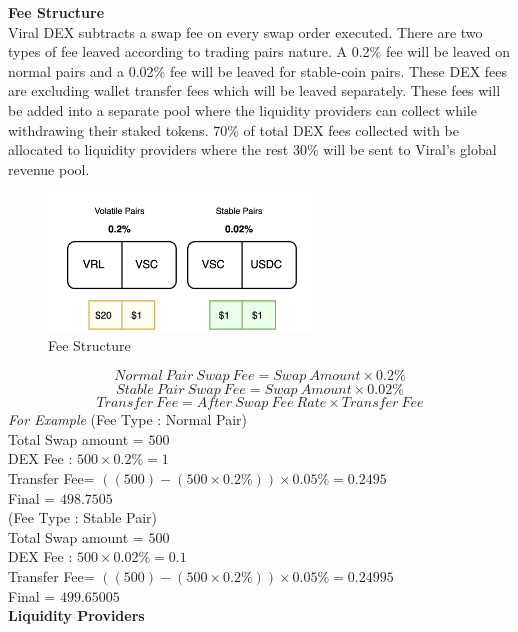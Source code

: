 \documentclass[conference]{IEEEtran}
\begin{document}
\textbf{Fee Structure}\\

Viral DEX subtracts a swap fee on every swap order executed. There are two types of fee leaved according to trading pairs nature. A 0.2\% fee will be leaved on normal pairs and a 0.02\% fee will be leaved for stable-coin pairs. These DEX fees are excluding wallet transfer fees which will be leaved separately. These fees will be added into a separate pool where the liquidity providers can collect while withdrawing their staked tokens. 70\% of total DEX fees collected with be allocated to liquidity providers where the rest 30\% will be sent to Viral's global revenue pool.\\

\begin{figure}[H]
\begin{center}
\includegraphics[width=7cm]{dex-fee}
\caption{Fee Structure}
\end{center}
\end{figure}
\[Normal\:Pair\:Swap\:Fee=Swap\:Amount \times  0.2\%\]
\[Stable\:Pair\:Swap\:Fee=Swap\:Amount \times  0.02\%\]
\[Transfer\:Fee=After\:Swap\:Fee\:Rate \times  Transfer\:Fee\]
\textit{For Example} 
(Fee Type : Normal Pair) \\
Total Swap amount = $500$\\
DEX Fee : $500 \times  0.2\% = 1$ \\
Transfer Fee= $((500)-(500 \times  0.2\%)) \times  0.05\% = 0.2495$ \\
Final = $498.7505$\\

(Fee Type : Stable Pair) \\
Total Swap amount = $500$\\
DEX Fee : $500 \times  0.02\% = 0.1$ \\
Transfer Fee= $((500)-(500 \times  0.2\%)) \times  0.05\% = 0.24995$ \\
Final = $499.65005$\\
 
 
\textbf{Liquidity Providers}\\
\end{document}
